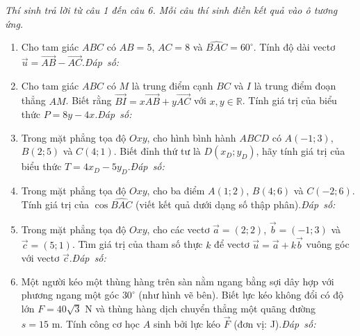 \documentclass[10pt,a4paper]{article}
\newcommand{\parttitle}[1]{\par\vspace{3.5pt}\needspace{3\baselineskip}{\large\bfseries\color{ink}#1}\par\nopagebreak\vspace{2pt}}
\newcommand{\answerbox}{\hfill\mbox{\textit{Đáp số:}\ \fbox{\rule{0pt}{7.5pt}\hspace{1.8cm}}}}
\begin{document}
\pagebreak
\parttitle{PHẦN III. Câu trắc nghiệm trả lời ngắn}
\textit{Thí sinh trả lời từ câu 1 đến câu 6. Mỗi câu thí sinh điền kết quả vào ô tương ứng.}
\begin{enumerate}
\item Cho tam giác $ABC$ có $AB = 5$, $AC = 8$ và $\widehat{BAC} = 60^\circ$. Tính độ dài vectơ $\vec{u} = \vec{AB} - \vec{AC}$.\answerbox

\item Cho tam giác $ABC$ có $M$ là trung điểm cạnh $BC$ và $I$ là trung điểm đoạn thẳng $AM$. Biết rằng $\vec{BI} = x\vec{AB} + y\vec{AC}$ với $x, y \in \mathbb{R}$. Tính giá trị của biểu thức $P = 8y - 4x$.\answerbox

\item Trong mặt phẳng tọa độ $Oxy$, cho hình bình hành $ABCD$ có $A(-1; 3)$, $B(2; 5)$ và $C(4; 1)$. Biết đỉnh thứ tư là $D(x_D; y_D)$, hãy tính giá trị của biểu thức $T = 4x_D - 5y_D$.\answerbox

\item Trong mặt phẳng tọa độ $Oxy$, cho ba điểm $A(1; 2)$, $B(4; 6)$ và $C(-2; 6)$. Tính giá trị của $\cos \widehat{BAC}$ (viết kết quả dưới dạng số thập phân).\answerbox

\item Trong mặt phẳng tọa độ $Oxy$, cho các vectơ $\vec{a} = (2; 2)$, $\vec{b} = (-1; 3)$ và $\vec{c} = (5; 1)$. Tìm giá trị của tham số thực $k$ để vectơ $\vec{u} = \vec{a} + k\vec{b}$ vuông góc với vectơ $\vec{c}$.\answerbox

\item \begin{minipage}[t]{0.70\linewidth}
Một người kéo một thùng hàng trên sàn nằm ngang bằng sợi dây hợp với phương ngang một góc $30^\circ$ (như hình vẽ bên). Biết lực kéo không đổi có độ lớn $F = 40\sqrt{3}\text{ N}$ và thùng hàng dịch chuyển thẳng một quãng đường $s = 15\text{ m}$. Tính công cơ học $A$ sinh bởi lực kéo $\vec{F}$ (đơn vị: J).\answerbox
\end{minipage}\hfill
\begin{minipage}[t]{0.28\linewidth}\raggedleft\vspace{-6pt}
\end{minipage}
\end{enumerate}
\end{document}

